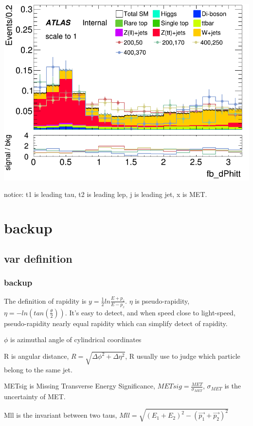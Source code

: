 \documentclass[usenames,dvipsnames]{beamer}
\begin{document}
\begin{frame}
\begin{minipage}{0.32\textwidth}
        \includegraphics[width=\textwidth]{graphics/HH_met_sig/HH_fb_dPhitt_norm.png}
    \end{minipage}
    notice: t1 is leading tau, t2 is leading lep, j is leading jet, x is MET.
\end{frame}


\section{backup}
\subsection{var definition}
\begin{frame}
	\frametitle{backup}
	The definition of rapidity is $y = \frac{1}{2}ln\frac{E+p_z}{E-p_z}$. $\eta$ is pseudo-rapidity, $\eta = -ln(tan(\frac{\theta}{2})).$ It's easy to detect, and when speed close to light-speed, pseudo-rapidity nearly equal rapidity which can simplify detect of rapidity.
	
	$\phi$ is azimuthal angle of cylindrical coordinates
	
	R is angular distance, $R = \sqrt{\Delta\phi^2+\Delta\eta^2}$, R usually use to judge which particle belong to the same jet.
	
	METsig is Missing Transverse Energy Significance, $METsig = \frac{MET}{\sigma_{MET}}$, $\sigma_{MET}$ is the uncertainty of MET.
	
	Mll is the invariant between two taus, $Mll = \sqrt{(E_1 + E_2)^2 - (\vec{p_1}+\vec{p_2})^2}$
\end{frame}
\end{document}
